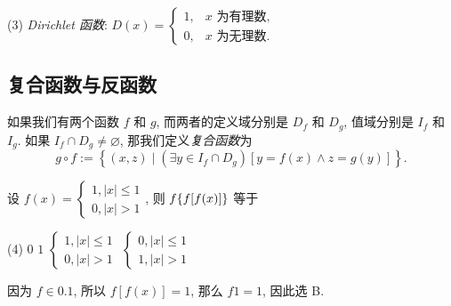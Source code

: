 (3) \textit{Dirichlet 函数}: $ D(x)=\begin{cases}
        1, & x \text { 为有理数, } \\ 0, & x \text { 为无理数. }
    \end{cases}$

\subsection{复合函数与反函数}

\begin{definition}[复合函数]
    如果我们有两个函数 $ f $ 和 $ g $, 而两者的定义域分别是 $ D_{f} $ 和 $ D_{g} $,
    值域分别是 $ I_{f} $ 和 $ I_{g} $. 如果 $ I_{f} \cap D_{g} \neq \varnothing $,
    那我们定义\textit{复合函数}为 $$ g \circ f:=\left\{(x, z) \mid\left(\exists y \in I_{f} \cap D_{g}\right)[y=f(x) \wedge z=g(y)]\right\} .$$
\end{definition}

\begin{example}[2001 数二]
    设 $f(x)=\begin{cases}
            1,|x|\leqslant 1 \\0,|x|>1
        \end{cases}$, 则 $f\qty{f[f(x)]}$ 等于
    \begin{tasks}(4)
        \task $0$
        \task $1$
        \task $\begin{cases}
                1,|x|\leqslant 1 \\0,|x|>1
            \end{cases}$
        \task $\begin{cases}
                0,|x|\leqslant 1 \\1,|x|>1
            \end{cases}$
    \end{tasks}
\end{example}
\begin{solution}
    因为 $f\in\qty{0,1}$, 所以 $f[f(x)]=1$, 那么 $f\qty{1}=1$, 因此选 B.
\end{solution}

